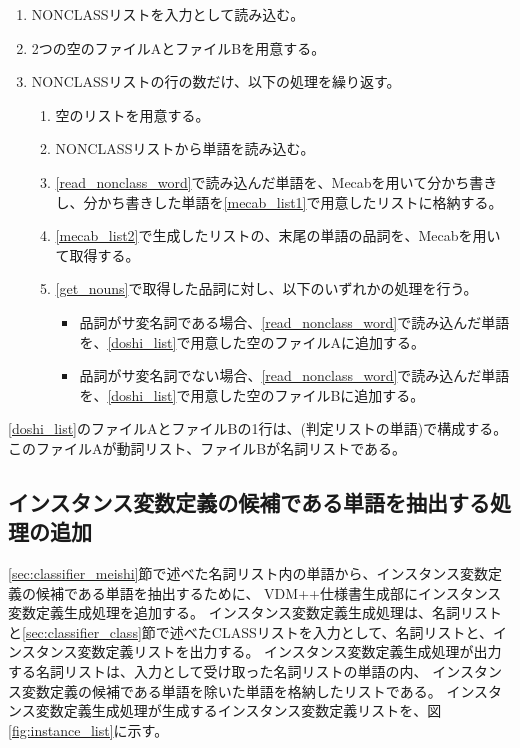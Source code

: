 \begin{enumerate}
    \item NONCLASSリストを入力として読み込む。
    \item 2つの空のファイルAとファイルBを用意する。
    \label{doshi_list}
    \item NONCLASSリストの行の数だけ、以下の処理を繰り返す。
        \begin{enumerate}
            \item 空のリストを用意する。
            \label{mecab_list1}
            \item NONCLASSリストから単語を読み込む。
            \label{read_nonclass_word}
            \item \ref{read_nonclass_word}で読み込んだ単語を、Mecabを用いて分かち書きし、分かち書きした単語を\ref{mecab_list1}で用意したリストに格納する。
            \label{mecab_list2}
            \item \ref{mecab_list2}で生成したリストの、末尾の単語の品詞を、Mecabを用いて取得する。
            \label{get_nouns}
            \item \ref{get_nouns}で取得した品詞に対し、以下のいずれかの処理を行う。
                \begin{itemize}
                    \item 品詞がサ変名詞である場合、\ref{read_nonclass_word}で読み込んだ単語を、\ref{doshi_list}で用意した空のファイルAに追加する。
                    \item 品詞がサ変名詞でない場合、\ref{read_nonclass_word}で読み込んだ単語を、\ref{doshi_list}で用意した空のファイルBに追加する。
                \end{itemize}
        \end{enumerate}
\end{enumerate}

\ref{doshi_list}のファイルAとファイルBの1行は、(判定リストの単語)で構成する。
このファイルAが動詞リスト、ファイルBが名詞リストである。

\subsection{インスタンス変数定義の候補である単語を抽出する処理の追加}
\ref{sec:classifier_meishi}節で述べた名詞リスト内の単語から、インスタンス変数定義の候補である単語を抽出するために、
VDM++仕様書生成部にインスタンス変数定義生成処理を追加する。
インスタンス変数定義生成処理は、名詞リストと\ref{sec:classifier_class}節で述べたCLASSリストを入力として、名詞リストと、インスタンス変数定義リストを出力する。
インスタンス変数定義生成処理が出力する名詞リストは、入力として受け取った名詞リストの単語の内、
インスタンス変数定義の候補である単語を除いた単語を格納したリストである。
インスタンス変数定義生成処理が生成するインスタンス変数定義リストを、図\ref{fig:instance_list}に示す。

